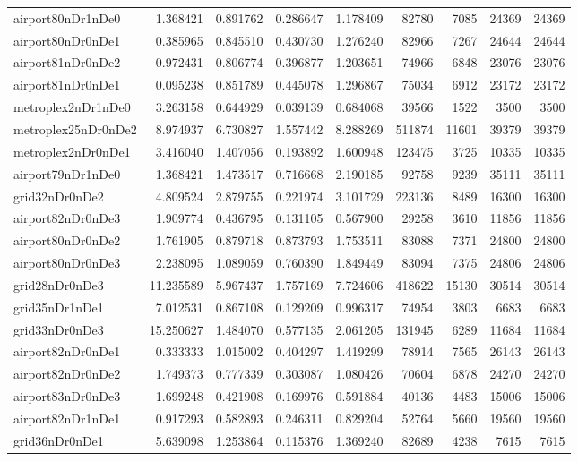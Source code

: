 \begin{longtable}{|l|r|r|r|r|r|r|r|r|}
airport80nDr1nDe0 & 1.368421 & 0.891762 & 0.286647 & 1.178409 & 82780 & 7085 & 24369 & 24369 \\
airport80nDr0nDe1 & 0.385965 & 0.845510 & 0.430730 & 1.276240 & 82966 & 7267 & 24644 & 24644 \\
airport81nDr0nDe2 & 0.972431 & 0.806774 & 0.396877 & 1.203651 & 74966 & 6848 & 23076 & 23076 \\
airport81nDr0nDe1 & 0.095238 & 0.851789 & 0.445078 & 1.296867 & 75034 & 6912 & 23172 & 23172 \\
metroplex2nDr1nDe0 & 3.263158 & 0.644929 & 0.039139 & 0.684068 & 39566 & 1522 & 3500 & 3500 \\
metroplex25nDr0nDe2 & 8.974937 & 6.730827 & 1.557442 & 8.288269 & 511874 & 11601 & 39379 & 39379 \\
metroplex2nDr0nDe1 & 3.416040 & 1.407056 & 0.193892 & 1.600948 & 123475 & 3725 & 10335 & 10335 \\
airport79nDr1nDe0 & 1.368421 & 1.473517 & 0.716668 & 2.190185 & 92758 & 9239 & 35111 & 35111 \\
grid32nDr0nDe2 & 4.809524 & 2.879755 & 0.221974 & 3.101729 & 223136 & 8489 & 16300 & 16300 \\
airport82nDr0nDe3 & 1.909774 & 0.436795 & 0.131105 & 0.567900 & 29258 & 3610 & 11856 & 11856 \\
airport80nDr0nDe2 & 1.761905 & 0.879718 & 0.873793 & 1.753511 & 83088 & 7371 & 24800 & 24800 \\
airport80nDr0nDe3 & 2.238095 & 1.089059 & 0.760390 & 1.849449 & 83094 & 7375 & 24806 & 24806 \\
grid28nDr0nDe3 & 11.235589 & 5.967437 & 1.757169 & 7.724606 & 418622 & 15130 & 30514 & 30514 \\
grid35nDr1nDe1 & 7.012531 & 0.867108 & 0.129209 & 0.996317 & 74954 & 3803 & 6683 & 6683 \\
grid33nDr0nDe3 & 15.250627 & 1.484070 & 0.577135 & 2.061205 & 131945 & 6289 & 11684 & 11684 \\
airport82nDr0nDe1 & 0.333333 & 1.015002 & 0.404297 & 1.419299 & 78914 & 7565 & 26143 & 26143 \\
airport82nDr0nDe2 & 1.749373 & 0.777339 & 0.303087 & 1.080426 & 70604 & 6878 & 24270 & 24270 \\
airport83nDr0nDe3 & 1.699248 & 0.421908 & 0.169976 & 0.591884 & 40136 & 4483 & 15006 & 15006 \\
airport82nDr1nDe1 & 0.917293 & 0.582893 & 0.246311 & 0.829204 & 52764 & 5660 & 19560 & 19560 \\
grid36nDr0nDe1 & 5.639098 & 1.253864 & 0.115376 & 1.369240 & 82689 & 4238 & 7615 & 7615 \\

\end{longtable}
